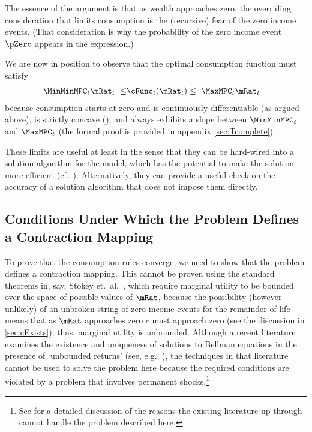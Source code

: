 \documentclass[./BufferStockTheory.tex]{subfiles}
\begin{document}
The essence of the argument is that as wealth approaches zero, the overriding
consideration that limits consumption is the (recursive) fear of the zero
income events.  (That consideration is why the probability of the zero
income event $\pZero$ appears in the expression.)  

We are now in position to observe that the optimal consumption function must satisfy
\begin{align}
  \MinMinMPC_{t} \mRat_{t} ~ \leq &   \cFunc_{t}(\mRat_{t})  \leq  ~ \MaxMPC_{t} \mRat_{t} \label{eq:cBounds}
\end{align}
because consumption starts at zero and is continuously
differentiable (as argued above), is strictly
concave (\cite{ckConcavity}), and always exhibits a
slope between $\MinMinMPC_{t}$ and $\MaxMPC_{t}$ (the formal proof is provided in appendix \ref{sec:Tcomplete}).

These limits are useful at least in the sense that they can be hard-wired into a solution algorithm for the model, which has the potential to make the solution more efficient (cf.\ \cite{cctwMoM}).  Alternatively, they can provide a useful check on the accuracy of a solution algorithm that does not impose them directly.

\begin{comment}
If the \FHWC~does not hold, we make do with a less useful bound on the minimal MPC: It is
weakly greater than zero, which follows from the logic in
\ref{sec:cExists}; hence the `max' in \eqref{eq:MinMinMPCDef}.
\end{comment}

\hypertarget{Conditions-Under-Which-the-Problem-Defines-a-Contraction-Mapping}{}
\subsection{Conditions Under Which the Problem Defines a Contraction Mapping}

\label{subsec:contraction}

To prove that the consumption rules converge, we need to show that the
problem defines a contraction mapping. This cannot be proven using the
standard theorems in, say, Stokey et.\ al.~\citeyearpar{slpMethods},
which require marginal utility to be bounded over the space of
possible values of $\mRat$, because the possibility (however unlikely)
of an unbroken string of zero-income events for the remainder of life
means that as $\mRat$ approaches zero $c$ must approach zero (see the
discussion in \ref{sec:cExists}); thus, marginal utility is unbounded.
Although a recent literature examines the existence and uniqueness 
of solutions to Bellman equations in the presence of `unbounded returns' (see, e.g.,
\cite{mnUnique}), the techniques in that literature
cannot be used to solve the problem here because the required conditions 
are violated by a problem that involves permanent shocks.\footnote{See \cite{yaoNote}
for a detailed discussion of the reasons the existing literature up through \cite{mnUnique} cannot handle 
the problem described here.}
\end{document}
